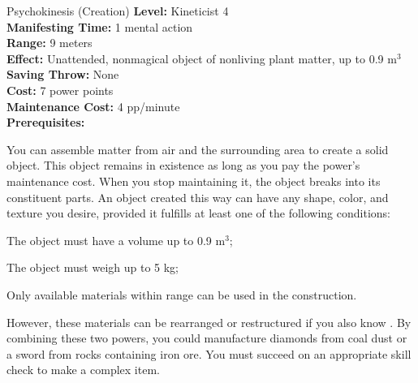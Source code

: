 {Psychokinesis (Creation)}
{
	\textbf{Level:}
	Kineticist 4\\
	\textbf{Manifesting Time:}
	1 mental action\\
	\textbf{Range:}
	9 meters\\
	\textbf{Effect:}
	Unattended, nonmagical object of nonliving plant matter, up to 0.9 m$^3$\\
	\textbf{Saving Throw:}
	None\\
	\textbf{Cost:}
	7 power points\\
	\textbf{Maintenance Cost:}
	4 pp/minute\\
	\textbf{Prerequisites:}
	\\
}
{
	You can assemble matter from air and the surrounding area to create a solid object. This object remains in existence as long as you pay the power's maintenance cost. When you stop maintaining it, the object breaks into its constituent parts. An object created this way can have any shape, color, and texture you desire, provided it fulfills at least one of the following conditions:
	\begin{enumerate*}
	\item The object must have a volume up to 0.9 m$^3$;
	\item The object must weigh up to 5 kg;
	\item Only available materials within range can be used in the construction.
	\end{enumerate*}

	However, these materials can be rearranged or restructured if you also know . By combining these two powers, you could manufacture diamonds from coal dust or a sword from rocks containing iron ore. You must succeed on an appropriate skill check to make a complex item.
}